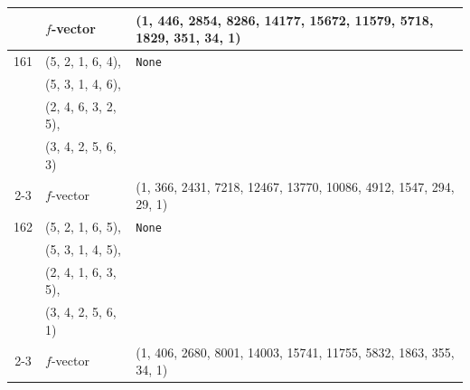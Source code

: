 \documentclass[10pt]{amsart}
\numberwithin{equation}{section}
\theoremstyle{plain}
\theoremstyle{definition}
\theoremstyle{remark}
\begin{document}
{\begin{longtable}{c|l|l}
		& $f$-vector & {(1, 446, 2854, 8286, 14177, 15672, 11579, 5718, 1829, 351, 34, 1)} \\
		\midrule
		
		161 & (5, 2, 1, 6, 4), & \texttt{None} \\
		& (5, 3, 1, 4, 6), &  \\
		& (2, 4, 6, 3, 2, 5), &  \\
		& (3, 4, 2, 5, 6, 3) &  \\ \cline{2-3}
		
		& $f$-vector & {(1, 366, 2431, 7218, 12467, 13770, 10086, 4912, 1547, 294, 29, 1)} \\
		\midrule
		
		162 & (5, 2, 1, 6, 5), & \texttt{None} \\
		& (5, 3, 1, 4, 5), &  \\
		& (2, 4, 1, 6, 3, 5), &  \\
		& (3, 4, 2, 5, 6, 1) &  \\ \cline{2-3}
		
		& $f$-vector & {(1, 406, 2680, 8001, 14003, 15741, 11755, 5832, 1863, 355, 34, 1)} \\
		
		\bottomrule
\end{longtable}}
\end{document}
